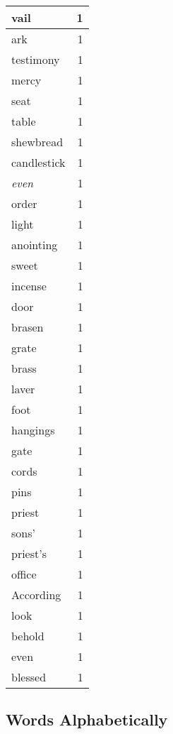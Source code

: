 \begin{center}
\begin{longtable}{l|r}
vail & 1 \\ \hline
ark & 1 \\ \hline
testimony & 1 \\ \hline
mercy & 1 \\ \hline
seat & 1 \\ \hline
table & 1 \\ \hline
shewbread & 1 \\ \hline
candlestick & 1 \\ \hline
\emph{even} & 1 \\ \hline
order & 1 \\ \hline
light & 1 \\ \hline
anointing & 1 \\ \hline
sweet & 1 \\ \hline
incense & 1 \\ \hline
door & 1 \\ \hline
brasen & 1 \\ \hline
grate & 1 \\ \hline
brass & 1 \\ \hline
laver & 1 \\ \hline
foot & 1 \\ \hline
hangings & 1 \\ \hline
gate & 1 \\ \hline
cords & 1 \\ \hline
pins & 1 \\ \hline
priest & 1 \\ \hline
sons' & 1 \\ \hline
priest's & 1 \\ \hline
office & 1 \\ \hline
According & 1 \\ \hline
look & 1 \\ \hline
behold & 1 \\ \hline
even & 1 \\ \hline
blessed & 1 \\ \hline
\end{longtable}
\end{center}



\normalsize



\subsection{Words Alphabetically}

